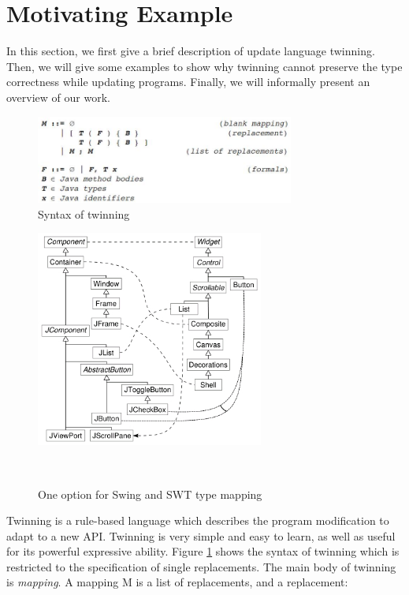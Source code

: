 \section{Motivating Example}
In this section, we first give a brief description of update language twinning. Then, we
will give some examples to show why twinning cannot preserve the type correctness while
updating programs. Finally,
we will informally present an overview of our work.
\label{example}
\begin{figure}
    \centering
    \includegraphics[width=8.5cm]{one}
    \caption{Syntax of twinning}
    \label{fig-syntax}
\end{figure}

\begin{figure}
    \centering
    \includegraphics[width=7.5cm]{two}
        \caption{One option for Swing and SWT type mapping}~\cite{icsm2010}
    \label{fig-swingtoswt}
\end{figure}
Twinning is a rule-based language which describes the program modification to adapt to 
a new API. 
Twinning is very simple and easy to learn, as well as useful for its
powerful expressive ability.
Figure \ref{fig-syntax} shows the syntax of twinning which is restricted to the specification of single 
replacements. The main body of twinning is \textit{mapping}. A mapping M is a list of replacements, and
a replacement:

\begin{align*}
    [ &\quad T_{1} \quad ( \quad F_{1} \quad ) \quad \{ \quad B_{1} \quad \} \\
      &\quad T_{2} \quad ( \quad F_{2} \quad ) \quad \{ \quad B_{2} \quad \} \quad]
\end{align*}

